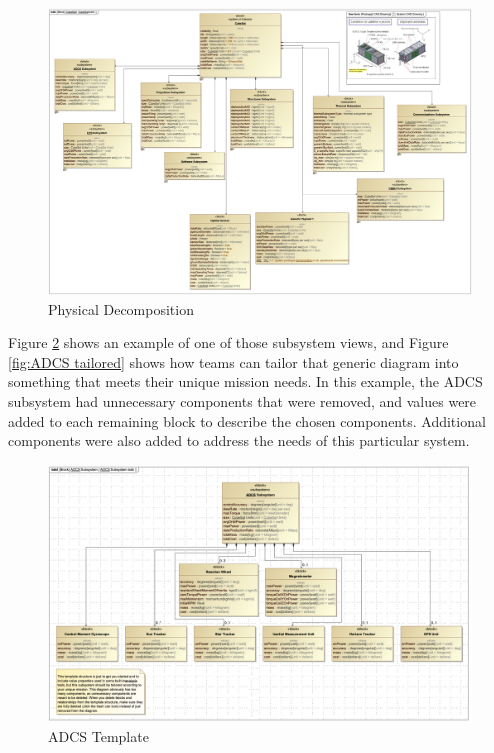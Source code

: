 \begin{figure}[H]
    \centering
    \includegraphics[scale=0.4, angle=90]{Thesis/Analysis_and_Results/Analysis and Results Figures/Physical Decomposition.png}
    \caption{Physical Decomposition}
    \label{fig:Physical Decomposition}
\end{figure}

Figure \ref{fig:ADCS Template} shows an example of one of those subsystem views, and Figure \ref{fig:ADCS tailored} shows how teams can tailor that generic diagram into something that meets their unique mission needs. In this example, the ADCS subsystem had unnecessary components that were removed, and values were added to each remaining block to describe the chosen components. Additional components were also added to address the needs of this particular system.

\begin{figure}[H]
    \centering
    \includegraphics[width=\textwidth]{Thesis/Analysis_and_Results/Analysis and Results Figures/ADCS empty.png}
    \caption{ADCS Template}
    \label{fig:ADCS Template}
\end{figure}

